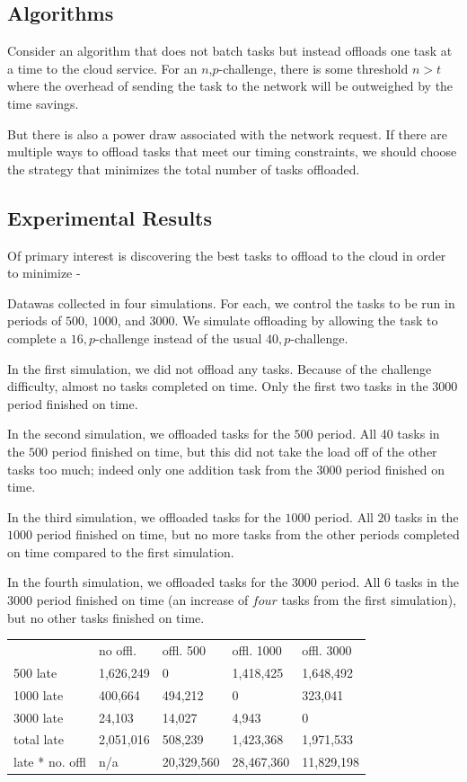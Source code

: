 \documentclass[twoside,twocolumn]{article}
\begin{document}
\subsection{Algorithms}

Consider an algorithm that does not batch tasks but instead offloads one task at a time to the cloud service.
For an $n$,$p$-challenge, there is some threshold $n>t$ where the overhead of sending the task to the network will be outweighed by the time savings.

But there is also a power draw associated with the network request.
If there are multiple ways to offload tasks that meet our timing constraints, we should choose the strategy that minimizes the total number of tasks offloaded.

\subsection{Experimental Results}

Of primary interest is discovering the best tasks to offload to the cloud in order to minimize -

Data\footnotemark was collected in four simulations.
For each, we control the tasks to be run in periods of $500$, $1000$, and $3000$.
We simulate offloading by allowing the task to complete a $16,p$-challenge instead of the usual $40,p$-challenge.

In the first simulation, we did not offload any tasks.
Because of the challenge difficulty, almost no tasks completed on time.
Only the first two tasks in the $3000$ period finished on time.

In the second simulation, we offloaded tasks for the $500$ period.
All 40 tasks in the $500$ period finished on time, but this did not take the load off of the other tasks too much; indeed only one addition task from the $3000$ period finished on time.

In the third simulation, we offloaded tasks for the $1000$ period.
All $20$ tasks in the $1000$ period finished on time, but no more tasks from the other periods completed on time compared to the first simulation.

In the fourth simulation, we offloaded tasks for the $3000$ period.
All $6$ tasks in the $3000$ period finished on time (an increase of $four$ tasks from the first simulation), but no other tasks finished on time.

\begin{center}
\begin{tabular}{ l l l l l }
          & no offl. & offl. 500 & offl. 1000 & offl. 3000 \\
500 late  & 1,626,249  & 0         & 1,418,425    & 1,648,492    \\
1000 late & 400,664   & 494,212    & 0          & 323,041     \\
3000 late & 24,103    & 14,027     & 4,943       & 0          \\
total late& 2,051,016  & 508,239    & 1,423,368    & 1,971,533 \\
late * no. offl& n/a & 20,329,560 & 28,467,360 & 11,829,198
\end{tabular}
\end{center}
\end{document}
